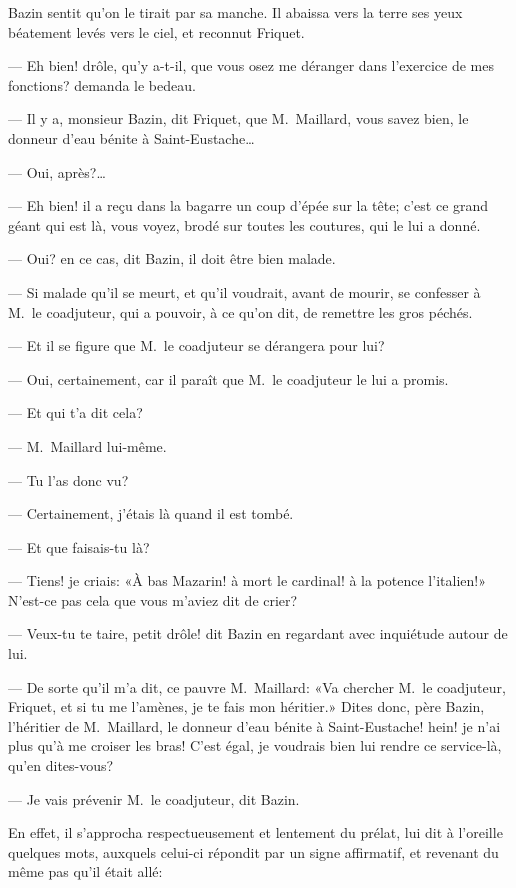 Bazin sentit qu'on le tirait par sa manche. Il abaissa vers la terre ses yeux béatement levés vers le ciel, et reconnut Friquet.

— Eh bien! drôle, qu'y a-t-il, que vous osez me déranger dans l'exercice de mes fonctions? demanda le bedeau.

— Il y a, monsieur Bazin, dit Friquet, que M.~Maillard, vous savez bien, le donneur d'eau bénite à Saint-Eustache\dots

— Oui, après?\dots

— Eh bien! il a reçu dans la bagarre un coup d'épée sur la tête; c'est ce grand géant qui est là, vous voyez, brodé sur toutes les coutures, qui le lui a donné.

— Oui? en ce cas, dit Bazin, il doit être bien malade.

— Si malade qu'il se meurt, et qu'il voudrait, avant de mourir, se confesser à M.~le coadjuteur, qui a pouvoir, à ce qu'on dit, de remettre les gros péchés.

— Et il se figure que M.~le coadjuteur se dérangera pour lui?

— Oui, certainement, car il paraît que M.~le coadjuteur le lui a promis.

— Et qui t'a dit cela?

— M.~Maillard lui-même.

— Tu l'as donc vu?

— Certainement, j'étais là quand il est tombé.

— Et que faisais-tu là?

— Tiens! je criais: «À bas Mazarin! à mort le cardinal! à la potence l'italien!» N'est-ce pas cela que vous m'aviez dit de crier?

— Veux-tu te taire, petit drôle! dit Bazin en regardant avec inquiétude autour de lui.

— De sorte qu'il m'a dit, ce pauvre M.~Maillard: «Va chercher M.~le coadjuteur, Friquet, et si tu me l'amènes, je te fais mon héritier.» Dites donc, père Bazin, l'héritier de M.~Maillard, le donneur d'eau bénite à Saint-Eustache! hein! je n'ai plus qu'à me croiser les bras! C'est égal, je voudrais bien lui rendre ce service-là, qu'en dites-vous?

— Je vais prévenir M.~le coadjuteur, dit Bazin.

En effet, il s'approcha respectueusement et lentement du prélat, lui dit à l'oreille quelques mots, auxquels celui-ci répondit par un signe affirmatif, et revenant du même pas qu'il était allé:

